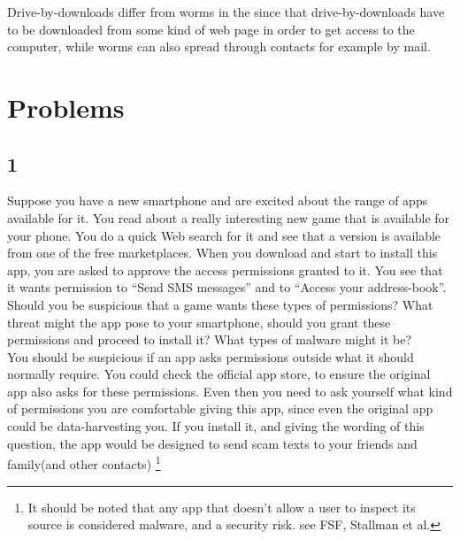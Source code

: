 \documentclass{article}
\begin{document}


Drive-by-downloads differ from worms in the since that drive-by-downloads have to be downloaded from some kind of web page in order to get access to the computer, while worms can also spread through contacts for example by mail.
\section{Problems}

\subsection{1}
Suppose you have a new smartphone and are excited about the range of apps available for it. You read about a really interesting new game that is available for your phone. You do a quick Web search for it and see that a version is available from one of the free marketplaces. When you download and start to install this app, you are asked to approve the access permissions granted to it. You see that it wants permission to “Send SMS messages” and to “Access your address-book”. Should you be suspicious that a game wants these types of permissions? What threat might the app pose to your smartphone, should you grant these permissions and proceed to install it? What types of malware might it be?\\

You should be suspicious if an app asks permissions outside what it should normally
require. You could check the official app store, to ensure the original app also asks
for these permissions. Even then you need to ask yourself what kind of permissions you
are comfortable giving this app, since even the original app could be data-harvesting you.
If you install it, and giving the wording of this question, the app would be designed
to send scam texts to your friends and family(and other contacts)
\footnote{It should be noted that any app that doesn't allow a user to inspect its
source is considered malware, and a security risk. see FSF, Stallman et al.}

\end{document}
